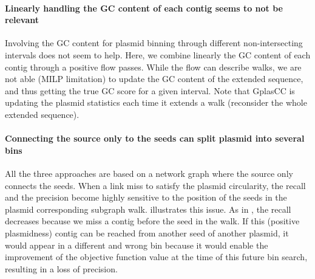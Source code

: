 \paragraph{Linearly handling the GC content of each contig seems to not be relevant}
Involving the GC content for plasmid binning through different non-intersecting intervals does not seem to help.
Here, we combine linearly the GC content of each contig through a positive flow passes.
While the flow can describe walks, we are not able (MILP limitation) to update the GC content of the extended sequence, and thus getting the true GC score for a given interval.
Note that GplasCC is updating the plasmid statistics each time it extends a walk (reconsider the whole extended sequence).

\paragraph{Connecting the source only to the seeds can split plasmid into several bins}
All the three approaches are based on a network graph where the source only connects the seeds.
When a link miss to satisfy the plasmid circularity, the recall and the precision become highly sensitive to the position of the seeds in the plasmid corresponding subgraph walk.
 illustrates this issue.
As in , the recall decreases because we miss a contig before the seed in the walk.
If this (positive plasmidness) contig can be reached from another seed of another plasmid, it would appear in a different and wrong bin because it would enable the improvement of the objective function value at the time of this future bin search, resulting in a loss of precision.


